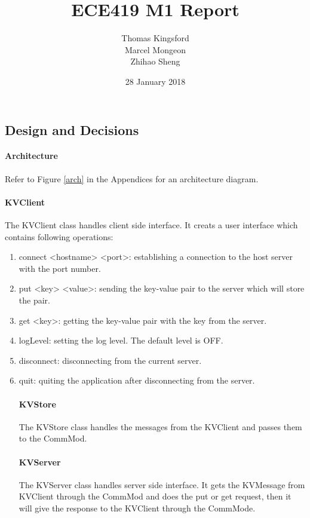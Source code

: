 \documentclass[12pt]{article}
\title{ECE419 M1 Report}
\date{28 January 2018}
\author{Thomas Kingsford\\Marcel Mongeon\\Zhihao Sheng}
\begin{document}
\begin{multicols}{2}
\maketitle

\section{Design and Decisions}

\paragraph{Architecture} Refer to Figure \ref{arch} in the Appendices for an architecture diagram.

\paragraph{KVClient} The KVClient class handles client side interface. It creats a user interface which contains following operations:

\begin{enumerate}
    \item connect <hostname> <port>: establishing a connection to the host server with the port number.
    \item put <key> <value>: sending the key-value pair to the server which will store the pair.
    \item get <key>: getting the key-value pair with the key from the server.
    \item logLevel: setting the log level. The default level is OFF.
    \item disconnect: disconnecting from the current server.
    \item quit: quiting the application after disconnecting from the server.

\paragraph{KVStore} The KVStore class handles the messages from the KVClient and passes them to the CommMod.

\paragraph{KVServer} The KVServer class handles server side interface. It gets the KVMessage from KVClient through the CommMod and does the put or get request, then it will give the response to the KVClient through the CommMode.


\end{enumerate}
\end{multicols}
\end{document}
